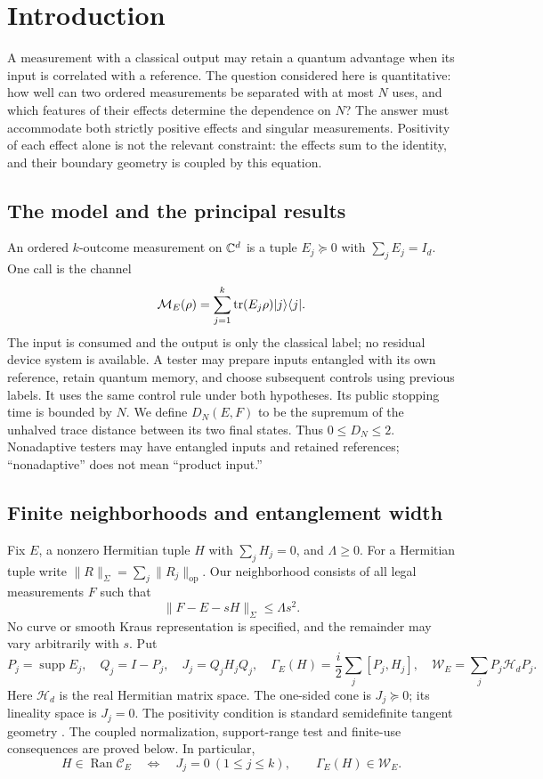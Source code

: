 \section{Introduction}\label{sec:introduction84}
A measurement with a classical output may retain a quantum advantage
when its input is correlated with a reference.  The question considered
here is quantitative: how well can two ordered measurements be
separated with at most $N$ uses, and which features of their effects
determine the dependence on $N$?  The answer must accommodate both
strictly positive effects and singular measurements.  Positivity of
each effect alone is not the relevant constraint: the effects sum to
the identity, and their boundary geometry is coupled by this equation.

\subsection{The model and the principal results}
An ordered $k$-outcome measurement on $\mathbb C^d$ is a tuple
$E_j\succeq0$ with $\sum_jE_j=I_d$.  One call is the channel
\[
 \mathcal M_E(\rho)=\sum_{j=1}^k\operatorname{tr}(E_j\rho)|j\rangle\langle j|.
\]
The input is consumed and the output is only the classical label;
no residual device system is available.  A tester may prepare inputs
entangled with its own reference, retain quantum memory, and choose
subsequent controls using previous labels.  It uses the same control
rule under both hypotheses.  Its public stopping time is bounded
by $N$.  We define $D_N(E,F)$ to be the supremum of the unhalved
trace distance between its two final states.  Thus $0\le D_N\le2$.
Nonadaptive testers may have entangled inputs and retained references;
``nonadaptive'' does not mean ``product input.''

\subsection{Finite neighborhoods and entanglement width}
Fix $E$, a nonzero Hermitian tuple $H$ with $\sum_jH_j=0$, and
$\Lambda\ge0$.  For a Hermitian tuple write
$\|R\|_\Sigma=\sum_j\|R_j\|_{\mathrm{op}}$.  Our neighborhood
consists of all legal measurements $F$ such that
\begin{equation}\label{eq:fronttube87}
 \|F-E-sH\|_\Sigma\le\Lambda s^2.
\end{equation}
No curve or smooth Kraus representation is specified, and the
remainder may vary arbitrarily with $s$.  Put
\[
 P_j=\operatorname{supp}E_j,\quad Q_j=I-P_j,\quad
 J_j=Q_jH_jQ_j,\quad
 \Gamma_E(H)=\frac i2\sum_j[P_j,H_j],\quad
 \mathcal W_E=\sum_jP_j\mathcal H_dP_j.
\]
Here $\mathcal H_d$ is the real Hermitian matrix space.  The
one-sided cone is $J_j\succeq0$; its lineality space is $J_j=0$.
The positivity condition is standard semidefinite tangent geometry
\cite{BCS87}.  The coupled normalization, support-range test and
finite-use consequences are proved below.  In particular,
\[
 H\in\operatorname{Ran}\mathcal C_E
 \quad\Longleftrightarrow\quad
 J_j=0\ (1\le j\le k),\qquad \Gamma_E(H)\in\mathcal W_E.
\]

